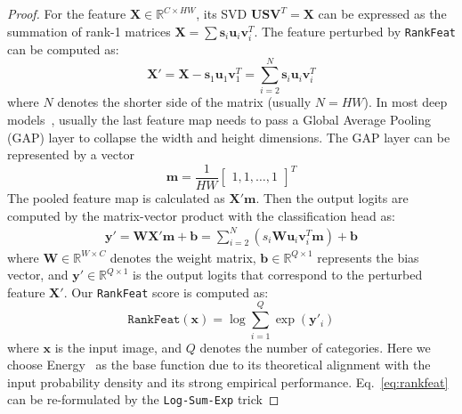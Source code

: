 \begin{proof}

For the feature $\mathbf{X}{\in}\mathbb{R}^{C{\times}HW}$, its SVD  $\mathbf{U}\mathbf{S}\mathbf{V}^{T}{=}\mathbf{X}$ can be expressed as the summation of rank-1 matrices $\mathbf{X}{=}\sum\mathbf{s}_{i}\mathbf{u}_{i}\mathbf{v}_{i}^{T}$. The feature perturbed by \texttt{RankFeat} can be computed as:
\begin{equation}
    \mathbf{X}' = \mathbf{X} - \mathbf{s}_{1}\mathbf{u}_{1}\mathbf{v}_{1}^{T} = \sum_{i=2}^{N} \mathbf{s}_{i}\mathbf{u}_{i}\mathbf{v}_{i}^{T}
\end{equation}
where $N$ denotes the shorter side of the matrix (usually $N{=}HW$). In most deep models~\cite{he2016deep,he2016identity}, usually the last feature map needs to pass a Global Average Pooling (GAP) layer to collapse the width and height dimensions. The GAP layer can be represented by a vector
\begin{equation}
    \mathbf{m}=\frac{1}{HW}\begin{bmatrix}1,1,\dots,1\end{bmatrix}^{T}
\end{equation}
The pooled feature map is calculated as $\mathbf{X}'\mathbf{m}$. Then the output logits are computed by the matrix-vector product with the classification head as:
\begin{equation}
\begin{gathered}
    \mathbf{y}'=\mathbf{W}\mathbf{X'}\mathbf{m}+\mathbf{b} = \sum_{i=2}^{N} (s_{i} \mathbf{W}\mathbf{u}_{i}\mathbf{v}_{i}^{T}\mathbf{m}) + \mathbf{b} 
    \label{eq:logit}
\end{gathered}
\end{equation}
where $\mathbf{W}{\in}\mathbb{R}^{W{\times}C}$ denotes the weight matrix, $\mathbf{b}{\in}\mathbb{R}^{Q{\times}1}$ represents the bias vector, and $\mathbf{y}'{\in}\mathbb{R}^{Q{\times}1}$ is the output logits that correspond to the perturbed feature $\mathbf{X}'$. Our \texttt{RankFeat} score is computed as:
\begin{equation}
    \texttt{RankFeat}(\mathbf{x}) = \log \sum_{i=1}^{Q} \exp(\mathbf{y}'_{i})
    \label{eq:rankfeat}
\end{equation}
where $\mathbf{x}$ is the input image, and $Q$ denotes the number of categories. Here we choose Energy~\cite{liu2020energy} as the base function due to its theoretical alignment with the input probability density and its strong empirical performance. Eq.~\eqref{eq:rankfeat} can be re-formulated by the \texttt{Log-Sum-Exp} trick

\end{proof}

